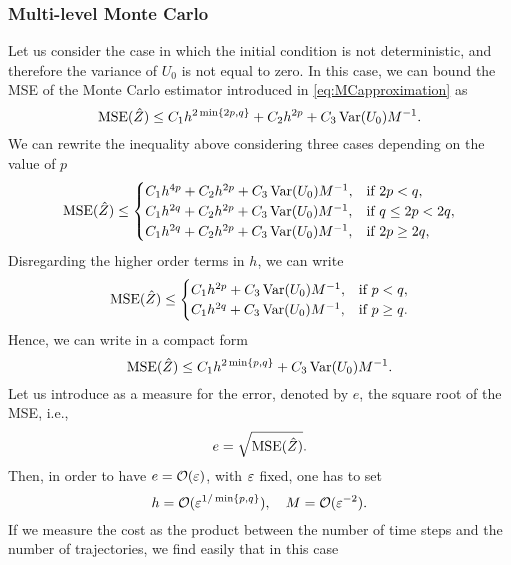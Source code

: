 \subsubsection{Multi-level Monte Carlo}

Let us consider the case in which the initial condition is not deterministic, and therefore the variance of $U_0$ is not equal to zero. In this case, we can bound the MSE of the Monte Carlo estimator introduced in \eqref{eq:MCapproximation} as
\begin{equation}
	\operatorname{MSE}(\hat Z) \leq C_1 h^{2\min\{2p, q\}} + C_2 h^{2p} + C_3 \operatorname{Var}(U_0) M^{-1}.
\end{equation}
We can rewrite the inequality above considering three cases depending on the value of $p$
\begin{equation}
	\operatorname{MSE}(\hat Z) \leq \begin{cases} C_1 h^{4p} + C_2 h^{2p} + C_3 \operatorname{Var}(U_0) M^{-1}, & \text{if } 2p < q,\\
									C_1 h^{2q} + C_2 h^{2p} + C_3 \operatorname{Var}(U_0) M^{-1}, & \text{if } q \leq 2p < 2q, \\																		
									C_1 h^{2q} + C_2 h^{2p} + C_3 \operatorname{Var}(U_0) M^{-1}, & \text{if } 2p \geq 2q,\\
						\end{cases}
\end{equation}
Disregarding the higher order terms in $h$, we can write 
\begin{equation}
	\operatorname{MSE}(\hat Z) \leq \begin{cases} C_1 h^{2p} + C_3 \operatorname{Var}(U_0)M^{-1}, & \text{if } p < q, \\
									C_1 h^{2q} + C_3 \operatorname{Var}(U_0)M^{-1} ,& \text{if } p \geq q.
						\end{cases}
\end{equation}
Hence, we can write in a compact form
\begin{equation}
	\operatorname{MSE}(\hat Z) \leq C_1 h^{2\min\{p, q\}} + C_3 \operatorname{Var}(U_0) M^{-1}.
\end{equation}
Let us introduce as a measure for the error, denoted by $e$, the square root of the MSE, i.e.,
\begin{equation}
	e = \sqrt{\operatorname{MSE}(\hat Z)}.
\end{equation}
Then, in order to have $e = \mathcal{O}(\varepsilon)$, with $\varepsilon$ fixed, one has to set
\begin{equation}
	h = \mathcal{O}(\varepsilon^{1 / \min\{p, q\}}), \quad M = \mathcal{O}(\varepsilon^{-2}).
\end{equation}
If we measure the cost as the product between the number of time steps and the number of trajectories, we find easily that in this case
